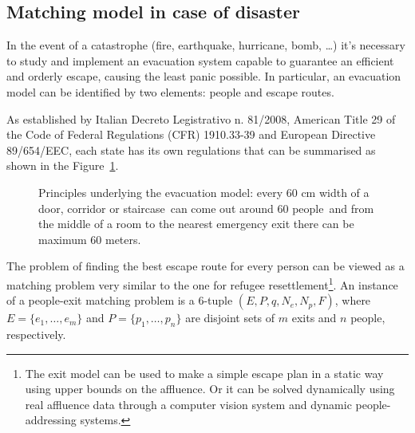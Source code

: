 \subsection{Matching model in case of disaster}\label{matching-model-in-case-of-disaster}%

In the event of a catastrophe (fire, earthquake, hurricane, bomb, \ldots) it's necessary to study and implement an evacuation system capable to guarantee an efficient and orderly escape, causing the least panic possible. In particular, an evacuation model can be identified by two elements: people and escape routes.

\nocite{it-81-2008,usa-1910-1974,cee-654-1989}%
As established by Italian Decreto Legistrativo n. 81/2008, American Title 29 of the Code of Federal Regulations (CFR)
1910.33-39 and European Directive 89/654/EEC, each state has its own regulations that can be summarised as shown in the Figure~\ref{fig:principle_behind_the_evacuation_model}.

\begin{figure}[!htb]
    \vspace{-0.75em}
    \centering{%
        \resizebox{0.9\columnwidth}{!}{%
            \def\svgwidth{\columnwidth}%
        }
    }
    \vspace{-0.75em}
    \caption{Principles underlying the evacuation model: every 60 cm width of a door, corridor or staircase\footnotemark \ can come out around 60 people\footnotemark \ and from the middle of a room to the nearest emergency exit there can be maximum 60 meters.}
    \label{fig:principle_behind_the_evacuation_model}
    \vspace{-1em}
\end{figure}
\addtocounter{footnote}{-2}

The problem of finding the best escape route for every person can be viewed as a matching problem very similar to the one for refugee resettlement\footnote{The exit model can be used to make a simple escape plan in a static way using upper bounds on the affluence.
Or it can be solved dynamically using real affluence data through a computer vision system and dynamic people-addressing systems.}. An instance of a people-exit matching problem is a 6-tuple \((E, P, q, N_e, N_p, F)\), where \(E = \{e_1, \dots, e_m\}\) and \(P = \{p_1, \dots, p_n\}\) are disjoint sets of \(m\) exits and \(n\) people, respectively.


